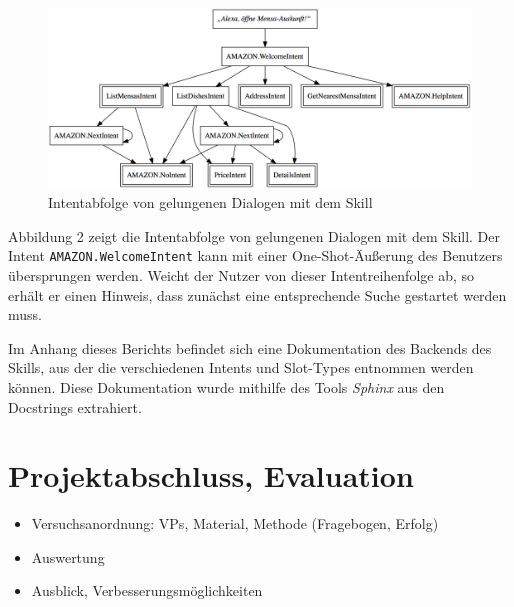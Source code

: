 \documentclass[12pt]{article}
\begin{document}
\begin{figure}[ht]
\center
\includegraphics[width=\textwidth]{intent-order.png}
\caption{Intentabfolge von gelungenen Dialogen mit dem Skill}
\end{figure}

Abbildung 2 zeigt die Intentabfolge von gelungenen Dialogen mit dem Skill.
Der Intent \texttt{AMAZON.WelcomeIntent} kann mit einer One-Shot-Äußerung des Benutzers übersprungen werden.
Weicht der Nutzer von dieser Intentreihenfolge ab, so erhält er einen Hinweis, dass zunächst eine entsprechende Suche gestartet werden muss.

Im Anhang dieses Berichts befindet sich eine Dokumentation des Backends des Skills, aus der die verschiedenen Intents und Slot-Types entnommen werden können.
Diese Dokumentation wurde mithilfe des Tools \emph{Sphinx} aus den Docstrings extrahiert.

\section{Projektabschluss, Evaluation}
\begin{itemize}
	\item Versuchsanordnung: VPs, Material, Methode (Fragebogen, Erfolg)
	\item Auswertung
	\item Ausblick, Verbesserungsmöglichkeiten
\end{itemize}

\newpage
{}







	
	
\end{document}
